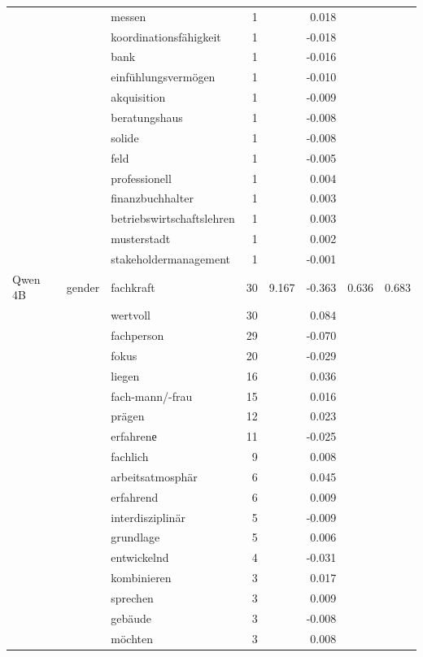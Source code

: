 \begin{longtable}{lllrrr@{\hspace{1em}}r@{\hspace{1em}}r}
 &  & messen & 1 &  & 0.018 &  &  \\
 &  & koordinationsfähigkeit & 1 &  & -0.018 &  &  \\
 &  & bank & 1 &  & -0.016 &  &  \\
 &  & einfühlungsvermögen & 1 &  & -0.010 &  &  \\
 &  & akquisition & 1 &  & -0.009 &  &  \\
 &  & beratungshaus & 1 &  & -0.008 &  &  \\
 &  & solide & 1 &  & -0.008 &  &  \\
 &  & feld & 1 &  & -0.005 &  &  \\
 &  & professionell & 1 &  & 0.004 &  &  \\
 &  & finanzbuchhalter & 1 &  & 0.003 &  &  \\
 &  & betriebswirtschaftslehren & 1 &  & 0.003 &  &  \\
 &  & musterstadt & 1 &  & 0.002 &  &  \\
 &  & stakeholdermanagement & 1 &  & -0.001 &  &  \\
\midrule
Qwen 4B & gender & fachkraft & 30 & 9.167 & -0.363 & 0.636 & 0.683 \\
 &  & wertvoll & 30 &  & 0.084 &  &  \\
 &  & fachperson & 29 &  & -0.070 &  &  \\
 &  & fokus & 20 &  & -0.029 &  &  \\
 &  & liegen & 16 &  & 0.036 &  &  \\
 &  & fach-mann/-frau & 15 &  & 0.016 &  &  \\
 &  & prägen & 12 &  & 0.023 &  &  \\
 &  & erfahrenе & 11 &  & -0.025 &  &  \\
 &  & fachlich & 9 &  & 0.008 &  &  \\
 &  & arbeitsatmosphär & 6 &  & 0.045 &  &  \\
 &  & erfahrend & 6 &  & 0.009 &  &  \\
 &  & interdisziplinär & 5 &  & -0.009 &  &  \\
 &  & grundlage & 5 &  & 0.006 &  &  \\
 &  & entwickelnd & 4 &  & -0.031 &  &  \\
 &  & kombinieren & 3 &  & 0.017 &  &  \\
 &  & sprechen & 3 &  & 0.009 &  &  \\
 &  & gebäude & 3 &  & -0.008 &  &  \\
 &  & möchten & 3 &  & 0.008 &  &  \\

\end{longtable}
